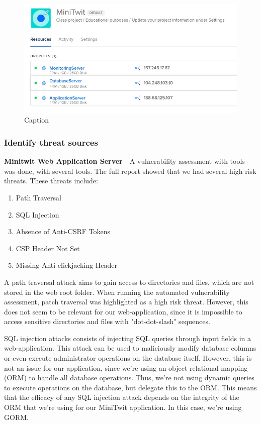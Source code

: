\begin{figure}[H]
    \centering
    \includegraphics[scale=.5]{images/digitalocean_droplets.jpg}
    \caption{Caption}
    \label{fig:digitalocean_droplets}
\end{figure}

\subsubsection{Identify threat sources}\label{sec:Identify_threat_sources_subsection}
\textbf{Minitwit Web Application Server} - A vulnerability assessment with tools was done, with several tools. The full report\cite{security_assesment_report} showed that we had several high risk threats. These threats include: 

\begin{enumerate}
    \item Path Traversal
    \item SQL Injection
    \item Absence of Anti-CSRF Tokens
    \item CSP Header Not Set
    \item Missing Anti-clickjacking Header
\end{enumerate}

A path traversal attack aims to gain access to directories and files, which are not stored in the web root folder\cite{owasp_path_traversal}. When running the automated vulnerability assessment, patch traversal was highlighted as a high risk threat. However, this does not seem to be relevant for our web-application, since it is impossible to access sensitive directories and files with "dot-dot-slash" sequences.


SQL injection attacks consists of injecting SQL queries through input fields in a web-application\cite{owasp_sql_injection}. This attack can be used to maliciously modify database columns or even execute administrator operations on the database itself. However, this is not an issue for our application, since we're using an object-relational-mapping (ORM) to handle all database operations. Thus, we're not using dynamic queries to execute operations on the database, but delegate this to the ORM. This means that the efficacy of any SQL injection attack depends on the integrity of the ORM that we're using for our MiniTwit application. In this case, we're using GORM.\cite{gorm}


